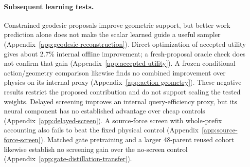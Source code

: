 \paragraph{Subsequent learning tests.}
Constrained geodesic proposals improve geometric support, but better work
prediction alone does not make the scalar learned guide a useful sampler
(Appendix~\ref{app:geodesic-reconstruction}). Direct optimization of accepted
utility gives about 2.7\% internal offline improvement; a fresh-proposal oracle
check does not confirm that gain (Appendix~\ref{app:accepted-utility}). A frozen
conditional action/geometry comparison likewise finds no combined improvement
over physics on its internal proxy (Appendix~\ref{app:action-geometry}). These
negative results restrict the proposed contribution and do not support scaling
the tested weights. Delayed screening improves an internal query-efficiency
proxy, but its neural component has no established advantage over cheap controls
(Appendix~\ref{app:delayed-screen}). A source-force screen with whole-prefix
accounting also fails to beat the fixed physical control
(Appendix~\ref{app:source-force-screen}). Matched gate pretraining and a larger
48-parent reused cohort likewise establish no screening gain over the no-screen
control (Appendix~\ref{app:gate-distillation-transfer}).

